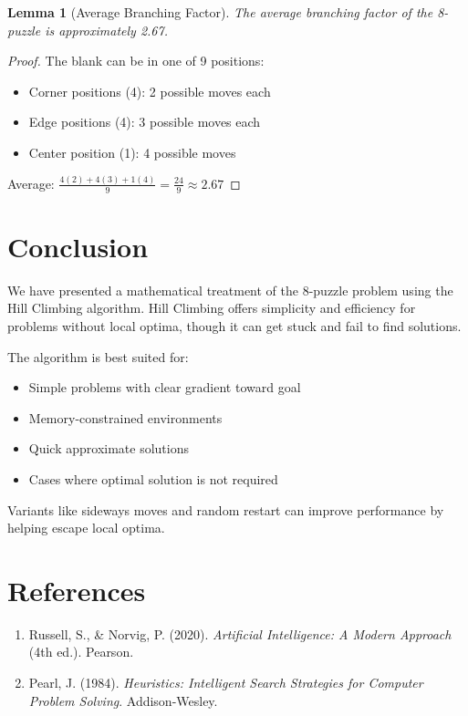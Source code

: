 \documentclass[12pt,a4paper]{article}
\newtheorem{lemma}{Lemma}
\begin{document}
\begin{lemma}[Average Branching Factor]
The average branching factor of the 8-puzzle is approximately 2.67.
\end{lemma}

\begin{proof}
The blank can be in one of 9 positions:
\begin{itemize}
    \item Corner positions (4): 2 possible moves each
    \item Edge positions (4): 3 possible moves each
    \item Center position (1): 4 possible moves
\end{itemize}
Average: $\frac{4(2) + 4(3) + 1(4)}{9} = \frac{24}{9} \approx 2.67$
\end{proof}

\section{Conclusion}

We have presented a mathematical treatment of the 8-puzzle problem using the Hill Climbing algorithm. Hill Climbing offers simplicity and efficiency for problems without local optima, though it can get stuck and fail to find solutions.

The algorithm is best suited for:
\begin{itemize}
    \item Simple problems with clear gradient toward goal
    \item Memory-constrained environments
    \item Quick approximate solutions
    \item Cases where optimal solution is not required
\end{itemize}

Variants like sideways moves and random restart can improve performance by helping escape local optima.

\section{References}

\begin{enumerate}
    \item Russell, S., \& Norvig, P. (2020). \textit{Artificial Intelligence: A Modern Approach} (4th ed.). Pearson.
    \item Pearl, J. (1984). \textit{Heuristics: Intelligent Search Strategies for Computer Problem Solving}. Addison-Wesley.
\end{enumerate}
\end{document}
